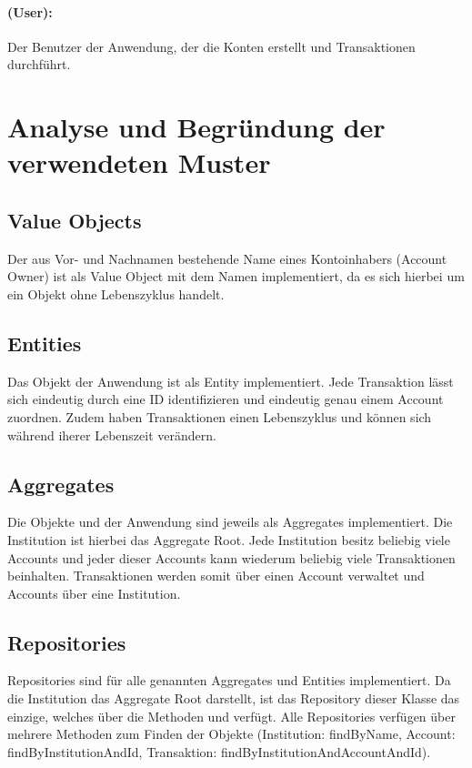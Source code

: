 \paragraph*{ (User):} Der Benutzer der Anwendung, der die Konten erstellt und Transaktionen durchführt.



\section{Analyse und Begründung der verwendeten Muster}
\label{chap:domainobj}
\subsection*{Value Objects}
Der aus Vor- und Nachnamen bestehende Name eines Kontoinhabers (Account Owner) ist als Value Object mit dem Namen  implementiert, da es sich hierbei um ein Objekt ohne Lebenszyklus handelt.
\subsection*{Entities}
Das Objekt  der Anwendung ist als Entity implementiert. Jede Transaktion lässt sich eindeutig durch eine ID identifizieren und eindeutig genau einem Account zuordnen. Zudem haben Transaktionen einen Lebenszyklus und können sich während iherer Lebenszeit verändern.
\subsection*{Aggregates}
Die Objekte  und  der Anwendung sind jeweils als Aggregates implementiert. Die Institution ist hierbei das Aggregate Root. Jede Institution besitz beliebig viele Accounts und jeder dieser Accounts kann wiederum beliebig viele Transaktionen beinhalten. Transaktionen werden somit über einen Account verwaltet und Accounts über eine Institution.
\subsection*{Repositories}
Repositories sind für alle genannten Aggregates und Entities implementiert. Da die Institution das Aggregate Root darstellt, ist das Repository dieser Klasse das einzige, welches über die Methoden  und  verfügt. Alle Repositories verfügen über mehrere Methoden zum Finden der Objekte (Institution: findByName, Account: findByInstitutionAndId, Transaktion: findByInstitutionAndAccountAndId). 

